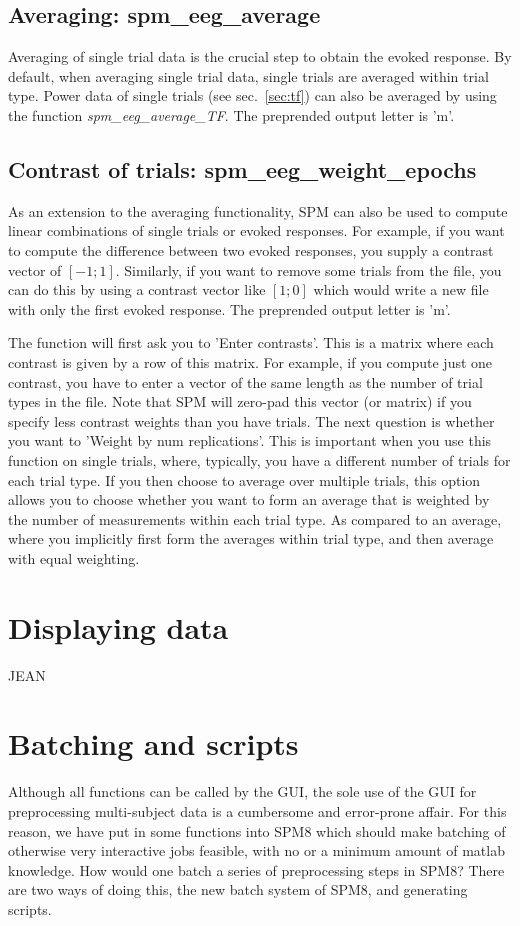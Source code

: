 \subsection{Averaging: spm\_eeg\_average}
Averaging of single trial data is the crucial step to obtain the
evoked response. By default, when averaging single trial data, single
trials are averaged within trial type. Power data of single trials
(see sec.~\ref{sec:tf}) can also be averaged by using the function
\textit{spm\_eeg\_average\_TF}. The preprended output letter is 'm'.


\subsection{Contrast of trials: spm\_eeg\_weight\_epochs}
As an extension to the averaging functionality, SPM can also be used
to compute linear combinations of single trials 
or evoked responses. For example, if you want to compute the
difference between two evoked responses, you supply a contrast vector
of $[-1; 1]$. Similarly, if you want to remove some trials from the
file, you can do this by using a contrast vector like $[1; 0]$ which
would write a new file with only the first evoked response. The
preprended output letter is 'm'. 

The function will first ask you to 'Enter contrasts'. This is a matrix where each contrast is given by a row of this matrix. For example, if you compute just one contrast, you have to enter a vector of the same length as the number of trial types in the file. Note that SPM will zero-pad this vector (or matrix) if you specify less contrast weights than you have trials. The next question is whether you want to 'Weight by num replications'. This is important when you use this function on single trials, where, typically, you have a different number of trials for each trial type. If you then choose to average over multiple trials, this option allows you to choose whether you want to form an average that is weighted by the number of measurements within each trial type. As compared to an average, where you implicitly first form the averages within trial type, and then average with equal weighting.

\section{Displaying data}
JEAN


\section{Batching and scripts}
Although all functions can be called by the GUI, the sole use of the GUI for preprocessing multi-subject data is a cumbersome and error-prone affair. For this reason, we have put in some functions into SPM8 which should make batching of otherwise very interactive jobs feasible, with no or a minimum amount of matlab knowledge. How would one batch a series of preprocessing steps in SPM8? There are two ways of doing this, the new batch system of SPM8, and generating scripts. 

